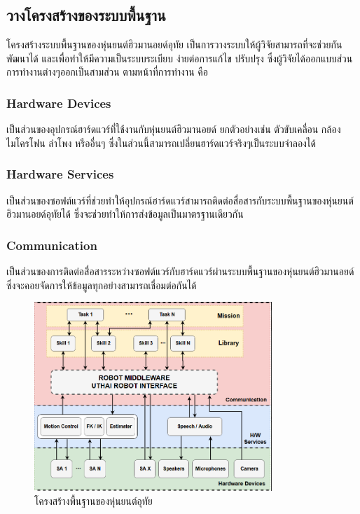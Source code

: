 \subsection{วางโครงสร้างของระบบพื้นฐาน}
โครงสร้างระบบพื้นฐานของหุ่นยนต์ฮิวมานอยด์อุทัย เป็นการวางระบบให้ผู้วิจัยสามารถที่จะช่วยกันพัฒนาได้
และเพื่อทำให้มีความเป็นระบบระเบียบ ง่ายต่อการแก้ไข ปรับปรุง
ซึ่งผู้วิจัยได้ออกแบบส่วนการทำงานต่างๆออกเป็นสามส่วน ตามหน้าที่การทำงาน คือ

\subsubsection*{Hardware Devices}
เป็นส่วนของอุปกรณ์ฮาร์ดแวร์ที่ใช้งานกับหุ่นยนต์ฮิวมานอยด์ ยกตัวอย่างเช่น ตัวขับเคลื่อน กล้อง ไมโครโฟน ลำโพง
หรืออื่นๆ ซึ่งในส่วนนี้สามารถเปลี่ยนฮาร์ดแวร์จริงๆเป็นระบบจำลองได้

\subsubsection*{Hardware Services}
เป็นส่วนของซอฟต์แวร์ที่ช่วยทำให้อุปกรณ์ฮาร์ดแวร์สามารถติดต่อสื่อสารกับระบบพื้นฐานของหุ่นยนต์ฮิวมานอยด์อุทัยได้
ซึ่งจะช่วยทำให้การส่งข้อมูลเป็นมาตรฐานเดียวกัน

\subsubsection*{Communication}
เป็นส่วนของการติดต่อสื่อสารระหว่างซอฟต์แวร์กับฮาร์ดแวร์ผ่านระบบพื้นฐานของหุ่นยนต์ฮิวมานอยด์ ซึ่งจะคอยจัดการให้ข้อมูลทุกอย่างสามารถเชื่อมต่อกันได้
\begin{figure}[!ht]
	\centering
	\includegraphics[width=0.8\textwidth]{chapter3/images/uthai_diagram.png}
	\caption{โครงสร้างพื้นฐานของหุ่นยนต์อุทัย}
	\label{fig:uthai_diagram}
\end{figure}

